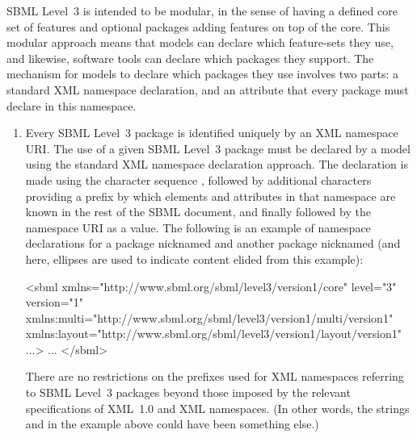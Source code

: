 SBML Level~3 is intended to be modular, in the sense of having a
defined core set of features and optional packages adding features
on top of the core.  This modular approach means that models can
declare which feature-sets they use, and likewise, software tools
can declare which packages they support.  The mechanism for models
to declare which packages they use involves two parts: a standard
XML namespace declaration, and an attribute that every package
must declare in this namespace.
\begin{enumerate}

\item Every SBML Level~3 package is identified uniquely by an XML
  namespace URI.  The use of a given SBML Level~3 package must be
  declared by a model using the standard XML namespace declaration
  approach.  The declaration is made using the character sequence
  , followed by additional characters providing a
  prefix by which elements and attributes in that namespace are
  known in the rest of the SBML document, and finally followed by
  the namespace URI as a value.  The following is an example of
  namespace declarations for a package nicknamed  and
  another package nicknamed  (and here, ellipses are
  used to indicate content elided from this example):
  \begin{example}
<sbml xmlns="http://www.sbml.org/sbml/level3/version1/core" level="3" version="1"
      xmlns:multi="http://www.sbml.org/sbml/level3/version1/multi/version1"
      xmlns:layout="http://www.sbml.org/sbml/level3/version1/layout/version1" ...>
  ...  
  </sbml>\end{example}
  There are no restrictions on the prefixes used for XML
  namespaces referring to SBML Level~3 packages beyond those
  imposed by the relevant specifications of XML~1.0 and XML
  namespaces.  (In other words, the strings
   and  in the example above could have
  been something else.)


\end{enumerate}
